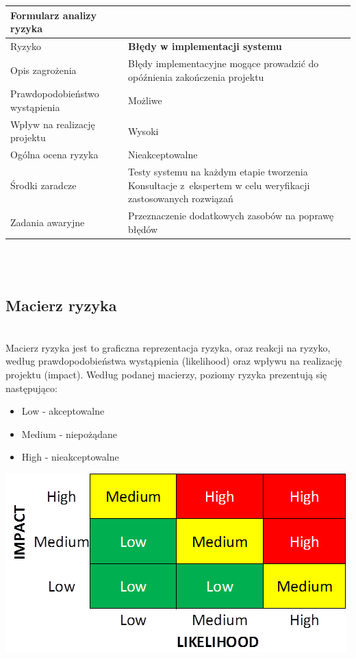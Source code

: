 \documentclass{article}
\begin{document}
\mbox{}\\\mbox{}\\

{\def\arraystretch{1.3}\tabcolsep=10pt
\begin{tabular}{|L{6cm}|L{9cm}|}
\hline
Formularz analizy ryzyka &  \\
\hline
Ryzyko 						   & \textbf{Błędy w implementacji systemu} \\
\hline
Opis zagrożenia				   & Błędy implementacyjne mogące prowadzić do opóźnienia zakończenia projektu \\
\hline
Prawdopodobieństwo wystąpienia & Możliwe \\
\hline
Wpływ na realizację projektu   & Wysoki \\
\hline
Ogólna ocena ryzyka   & Nieakceptowalne \\
\hline
Środki zaradcze				   & Testy systemu na każdym etapie tworzenia
Konsultacje z~ekspertem w celu weryfikacji zastosowanych rozwiązań
 \\
\hline
Zadania awaryjne			   & Przeznaczenie dodatkowych zasobów na poprawę błędów \\
\hline
\end{tabular}}

\mbox{}\\\mbox{}\\
\subsection{Macierz ryzyka}
\mbox{}\\
Macierz ryzyka jest to graficzna reprezentacja ryzyka, oraz reakcji na ryzyko, według prawdopodobieństwa wystąpienia (likelihood) oraz wpływu na realizację projektu (impact).
Według podanej macierzy, poziomy ryzyka prezentują się następująco:
\begin{itemize}
\item Low - akceptowalne
\item Medium - niepożądane
\item High - nieakceptowalne
\end{itemize}

\begin{center}
	\includegraphics[scale=0.5]{Updated-Risk-Matrix.jpg} %
\end{center}
\end{document}
